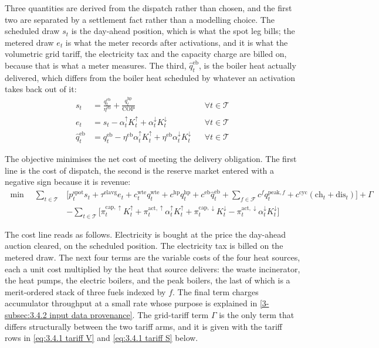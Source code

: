 Three quantities are derived from the dispatch rather than chosen, and the first two are separated by a settlement fact rather than a modelling choice. The scheduled draw $s_t$ is the day-ahead position, which is what the spot leg bills; the metered draw $e_t$ is what the meter records after activations, and it is what the volumetric grid tariff, the electricity tax and the capacity charge are billed on, because that is what a meter measures. The third, $\hat{q}^{\text{eb}}_t$, is the boiler heat actually delivered, which differs from the boiler heat scheduled by whatever an activation takes back out of it:
\begin{align}
    s_t &= \frac{q^{\text{eb}}_t}{\eta^{\text{eb}}} + \frac{q^{\text{hp}}_t}{\text{COP}} && \forall t \in \mathcal{T} \label{eq:3.4.1 sched draw} \\
    e_t &= s_t - \alpha^{\uparrow}_t K^{\uparrow}_t + \alpha^{\downarrow}_t K^{\downarrow}_t && \forall t \in \mathcal{T} \label{eq:3.4.1 metered draw} \\
    \hat{q}^{\text{eb}}_t &= q^{\text{eb}}_t - \eta^{\text{eb}} \alpha^{\uparrow}_t K^{\uparrow}_t + \eta^{\text{eb}} \alpha^{\downarrow}_t K^{\downarrow}_t && \forall t \in \mathcal{T} \label{eq:3.4.1 delivered eb}
\end{align}

The objective minimises the net cost of meeting the delivery obligation. The first line is the cost of dispatch, the second is the reserve market entered with a negative sign because it is revenue:
\begin{equation}
\begin{aligned}
\min \quad \sum_{t \in \mathcal{T}} & \Big[ p^{\text{spot}}_t s_t + \tau^{\text{elavg}} e_t + c^{\text{wte}}_t q^{\text{wte}}_t + c^{\text{hp}} q^{\text{hp}}_t + c^{\text{eb}} \hat{q}^{\text{eb}}_t + \sum_{f \in \mathcal{F}} c^{f} q^{\text{peak},f}_t + c^{\text{cyc}} (\text{ch}_t + \text{dis}_t) \Big] + \Gamma \\[3pt]
& - \sum_{t \in \mathcal{T}} \Big[ \pi^{\text{cap},\uparrow}_t K^{\uparrow}_t + \pi^{\text{act},\uparrow}_t \alpha^{\uparrow}_t K^{\uparrow}_t + \pi^{\text{cap},\downarrow}_t K^{\downarrow}_t - \pi^{\text{act},\downarrow}_t \alpha^{\downarrow}_t K^{\downarrow}_t \Big]
\end{aligned}
\label{eq:3.4.1 objective}
\end{equation}

The cost line reads as follows. Electricity is bought at the price the day-ahead auction cleared, on the scheduled position. The electricity tax is billed on the metered draw. The next four terms are the variable costs of the four heat sources, each a unit cost multiplied by the heat that source delivers: the waste incinerator, the heat pumps, the electric boilers, and the peak boilers, the last of which is a merit-ordered stack of three fuels indexed by $f$. The final term charges accumulator throughput at a small rate whose purpose is explained in \autoref{3-subsec:3.4.2 input data provenance}. The grid-tariff term $\Gamma$ is the only term that differs structurally between the two tariff arms, and it is given with the tariff rows in \autoref{eq:3.4.1 tariff V} and \autoref{eq:3.4.1 tariff S} below.

